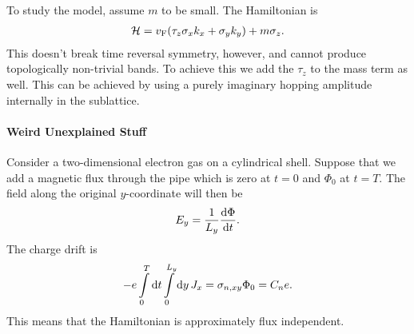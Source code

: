 To study the model, assume $m$ to be small. The Hamiltonian is
\begin{align*}
	\mathcal{H} = v_{\text{F}}(\tau_{z}\sigma_{x}k_{x} + \sigma_{y}k_{y}) + m\sigma_{z}.
\end{align*}
This doesn't break time reversal symmetry, however, and cannot produce topologically non-trivial bands. To achieve this we add the $\tau_{z}$ to the mass term as well. This can be achieved by using a purely imaginary hopping amplitude internally in the sublattice.

\paragraph{Weird Unexplained Stuff}
Consider a two-dimensional electron gas on a cylindrical shell. Suppose that we add a magnetic flux through the pipe which is zero at $t = 0$ and $\Phi_{0}$ at $t = T$. The field along the original $y$-coordinate will then be
\begin{align*}
	E_{y} = \frac{1}{L_{y}}\dv{\Phi}{t}.
\end{align*}
The charge drift is
\begin{align*}
	-e\int\limits_{0}^{T}\dd{t}\int\limits_{0}^{L_{y}}\dd{y}J_{x} = \sigma_{n, xy}\Phi_{0} = C_{n}e.
\end{align*}
This means that the Hamiltonian is approximately flux independent.